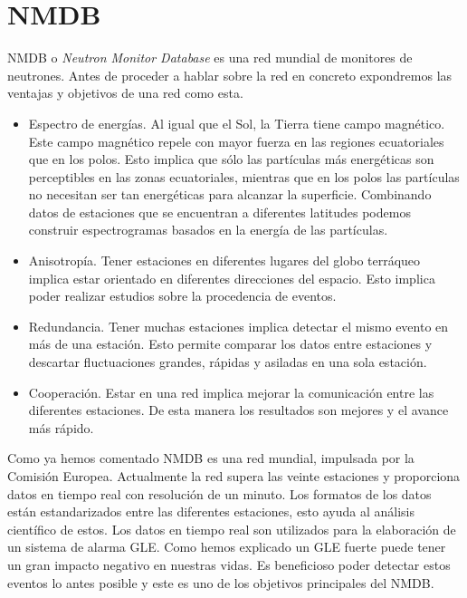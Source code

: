 \section{NMDB}
	NMDB\cite{NMDB2011} o \emph{Neutron Monitor Database} es una red mundial de monitores de neutrones. Antes de proceder a hablar sobre la red en
	concreto expondremos las ventajas y objetivos de una red como esta.
	\begin{itemize}
		\item 	Espectro de energías. Al igual que el Sol, la Tierra tiene campo magnético. Este campo magnético repele con mayor fuerza en
		  	las regiones ecuatoriales que en los polos. Esto implica que sólo las partículas más energéticas son perceptibles en las
			zonas ecuatoriales, mientras que en los polos las partículas no necesitan ser tan energéticas para alcanzar la superficie.
			Combinando datos de estaciones que se encuentran a diferentes latitudes podemos construir espectrogramas basados en la energía
			de las partículas.
		\item 	Anisotropía. Tener estaciones en diferentes lugares del globo terráqueo implica estar orientado en diferentes direcciones del
		  	espacio. Esto implica poder realizar estudios sobre la procedencia de eventos.
		\item 	Redundancia. Tener muchas estaciones implica detectar el mismo evento en más de una estación. Esto permite comparar los datos
		  	entre estaciones y descartar fluctuaciones grandes, rápidas y asiladas en una sola estación.
		\item 	Cooperación. Estar en una red implica mejorar la comunicación entre las diferentes estaciones. De esta manera los resultados
		  	son mejores y el avance más rápido. 
	\end{itemize}
	\par
	Como ya hemos comentado NMDB es una red mundial, impulsada por la Comisión Europea. Actualmente la red supera las veinte estaciones y
	proporciona datos en tiempo real con resolución de un minuto. Los formatos de los datos están estandarizados entre las diferentes estaciones,
	esto ayuda al análisis científico de estos. Los datos en tiempo real son utilizados para la elaboración de un sistema de alarma
	GLE\cite{GleAlarm}. Como hemos explicado un GLE fuerte puede tener un gran impacto negativo en nuestras vidas. Es beneficioso poder detectar
	estos eventos lo antes posible y este es uno de los objetivos principales del NMDB. 


